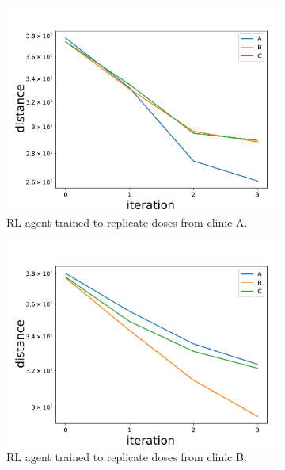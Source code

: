 \begin{figure}
	\centering
	\begin{subfigure}{0.32\linewidth}
		\centering
		\includegraphics[width=\linewidth]{ASTRO/distanceA_semilogy.pdf}
		\caption{RL agent trained to replicate doses from clinic A.}
		\label{fig:RL_clinic_A}
	\end{subfigure}
	\hfill
	\begin{subfigure}{0.32\linewidth}
		\centering
		\includegraphics[width=\linewidth]{ASTRO/distanceB_semilogy.pdf}
		\caption{RL agent trained to replicate doses from clinic B.}
		\label{fig:RL_clinic_B}
	\end{subfigure}
	\hfill
	\begin{subfigure}{0.32\linewidth}

\end{subfigure}
\end{figure}
